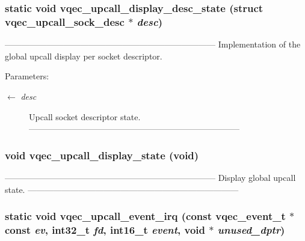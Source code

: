 \subsubsection{\setlength{\rightskip}{0pt plus 5cm}static void vqec\_\-upcall\_\-display\_\-desc\_\-state (struct \bf{vqec\_\-upcall\_\-sock\_\-desc} $\ast$ {\em desc})\hspace{0.3cm}{\tt  [static]}}\label{vqec__upcall__event_8c_89aa449aa46af41691afbac0cec9e4fa}


--------------------------------------------------------------------------- Implementation of the global upcall display per socket descriptor.

\begin{Desc}
\item[Parameters:]
\begin{description}
\item[\mbox{$\leftarrow$} {\em desc}]Upcall socket descriptor state. --------------------------------------------------------------------------- \end{description}
\end{Desc}
\subsubsection{\setlength{\rightskip}{0pt plus 5cm}void vqec\_\-upcall\_\-display\_\-state (void)}\label{vqec__upcall__event_8c_d5111e800a4f6f9011aacefd7e9166d7}


--------------------------------------------------------------------------- Display global upcall state. --------------------------------------------------------------------------- 
\subsubsection{\setlength{\rightskip}{0pt plus 5cm}static void vqec\_\-upcall\_\-event\_\-irq (const vqec\_\-event\_\-t $\ast$const  {\em ev}, int32\_\-t {\em fd}, int16\_\-t {\em event}, void $\ast$ {\em unused\_\-dptr})\hspace{0.3cm}{\tt  [static]}}\label{vqec__upcall__event_8c_207938bf1386db00331677bfd9d03266}


